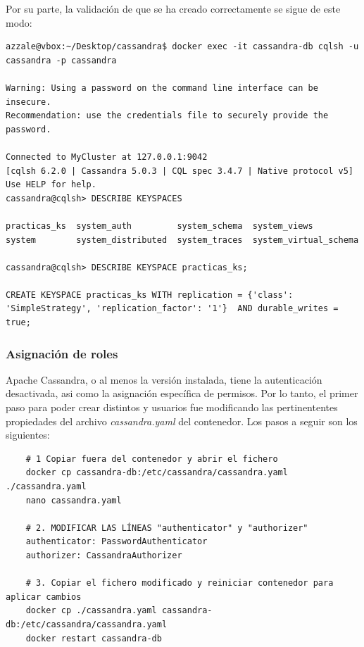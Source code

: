 \documentclass{article}
\begin{document}
Por su parte, la validación de que se ha creado correctamente se sigue de este modo:

\begin{tcolorbox}[colback=black, coltext=white, fontupper=\ttfamily, title=Terminal]
\begin{verbatim}
azzale@vbox:~/Desktop/cassandra$ docker exec -it cassandra-db cqlsh -u cassandra -p cassandra 

Warning: Using a password on the command line interface can be insecure.
Recommendation: use the credentials file to securely provide the password.

Connected to MyCluster at 127.0.0.1:9042
[cqlsh 6.2.0 | Cassandra 5.0.3 | CQL spec 3.4.7 | Native protocol v5]
Use HELP for help.
cassandra@cqlsh> DESCRIBE KEYSPACES

practicas_ks  system_auth         system_schema  system_views         
system        system_distributed  system_traces  system_virtual_schema

cassandra@cqlsh> DESCRIBE KEYSPACE practicas_ks;

CREATE KEYSPACE practicas_ks WITH replication = {'class': 'SimpleStrategy', 'replication_factor': '1'}  AND durable_writes = true;
\end{verbatim}
\end{tcolorbox}

\subsubsection{Asignación de roles}
Apache Cassandra, o al menos la versión instalada, tiene la autenticación desactivada, asi como la asignación específica de permisos. Por lo tanto, el primer paso para poder crear distintos y usuarios fue modificando las pertinententes propiedades del archivo \textit{cassandra.yaml} del contenedor. Los pasos a seguir son los siguientes:

\begin{lstlisting}
    # 1 Copiar fuera del contenedor y abrir el fichero
    docker cp cassandra-db:/etc/cassandra/cassandra.yaml ./cassandra.yaml
    nano cassandra.yaml

    # 2. MODIFICAR LAS LÍNEAS "authenticator" y "authorizer"
    authenticator: PasswordAuthenticator
    authorizer: CassandraAuthorizer

    # 3. Copiar el fichero modificado y reiniciar contenedor para aplicar cambios
    docker cp ./cassandra.yaml cassandra-db:/etc/cassandra/cassandra.yaml
    docker restart cassandra-db
\end{lstlisting}
\end{document}
